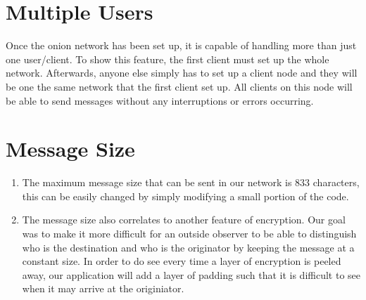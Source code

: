 \documentclass[10pt]{report}
\begin{document}
\section{Multiple Users}
    Once the onion network has been set up, it is capable of handling more than just one user/client. To show this feature, the first client must set up the whole network. Afterwards, anyone else simply has to set up a client node and they will be one the same network that the first client set up. All clients on this node will be able to send messages without any interruptions or errors occurring.
    
\section{Message Size}
    \begin{enumerate}
        \item The maximum message size that can be sent in our network is 833 characters, this can be easily changed by simply modifying a small portion of the code. 
        \item The message size also correlates to another feature of encryption. Our goal was to make it more difficult for an outside observer to be able to distinguish who is the destination and who is the originator by keeping the message at a constant size. In order to do see every time a layer of encryption is peeled away, our application will add a layer of padding such that it is difficult to see when it may arrive at the originiator.
    \end{enumerate}
\end{document}
